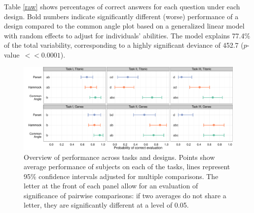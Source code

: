 \documentclass[journal]{vgtc}\usepackage{graphicx, color}
\begin{document}
Table \ref{raw} shows percentages of correct answers for each question under each design. Bold numbers indicate significantly different (worse) performance of a design compared to the common angle plot based on a generalized linear model with random effects to adjust for individuals' abilities. The model explains 77.4\% of the total variability, corresponding to a highly significant deviance of 452.7 ($p$-value~$<\!\!\!< 0.0001$).

%
%

\begin{figure}
\centering
\includegraphics[width=\textwidth]{model-summary.pdf}
\caption{\label{fig:model-summary}Overview of performance across tasks and designs. Points show average performance of subjects on each of the tasks, lines represent 95\% confidence intervals adjusted for multiple comparisons. The letter at the front of each panel allow for an evaluation of significance of pairwise comparisons: if two averages do not share a letter, they are significantly different at a level of 0.05.}
\end{figure}
\end{document}
